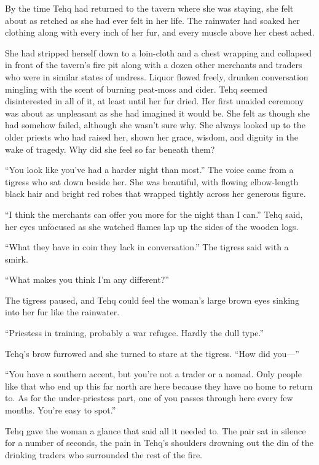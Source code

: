 By the time Tehq had returned to the tavern where she was staying, she felt about as retched as she had ever felt in her life. The rainwater had soaked her clothing along with every inch of her fur, and every muscle above her chest ached.

She had stripped herself down to a loin-cloth and a chest wrapping and collapsed in front of the tavern's fire pit along with a dozen other merchants and traders who were in similar states of undress. Liquor flowed freely, drunken conversation mingling with the scent of burning peat-moss and cider. Tehq seemed disinterested in all of it, at least until her fur dried. Her first unaided ceremony was about as unpleasant as she had imagined it would be. She felt as though she had somehow failed, although she wasn't sure why. She always looked up to the older priests who had raised her, shown her grace, wisdom, and dignity in the wake of tragedy. Why did she feel so far beneath them?

``You look like you've had a harder night than most.'' The voice came from a tigress who sat down beside her. She was beautiful, with flowing elbow-length black hair and bright red robes that wrapped tightly across her generous figure.

``I think the merchants can offer you more for the night than I can.'' Tehq said, her eyes unfocused as she watched flames lap up the sides of the wooden logs.

``What they have in coin they lack in conversation.'' The tigress said with a smirk.

``What makes you think I'm any different?''

The tigress paused, and Tehq could feel the woman's large brown eyes sinking into her fur like the rainwater.

``Priestess in training, probably a war refugee. Hardly the dull type.''

Tehq's brow furrowed and she turned to stare at the tigress. ``How did you---''

``You have a southern accent, but you're not a trader or a nomad. Only people like that who end up this far north are here because they have no home to return to. As for the under-priestess part, one of you passes through here every few months. You're easy to spot.''

Tehq gave the woman a glance that said all it needed to. The pair sat in silence for a number of seconds, the pain in Tehq's shoulders drowning out the din of the drinking traders who surrounded the rest of the fire.

